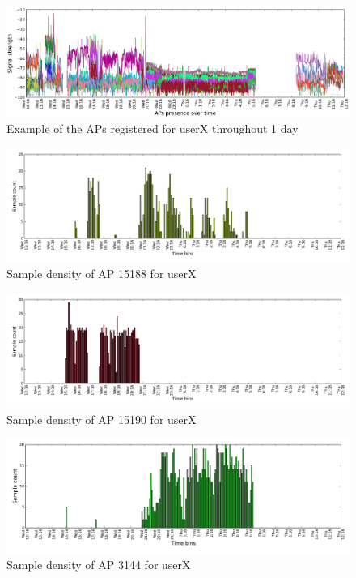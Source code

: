 \begin{figure}[!h]
\centering
\includegraphics[width =\textwidth]{figures/combinations/user_6_sorted_1days_plot_croped.png}
\caption{Example of the APs registered for userX throughout 1 day}
\label{rssi_6_2nd_day_A}
\end{figure}

\begin{figure}[!h]
\centering
\includegraphics[width =\textwidth]{figures/combinations/ap_15188_histo.png}
\caption{Sample density of AP 15188 for userX}
\label{samples_6_2nd_day_1_A}
\end{figure}

\begin{figure}[!h]
\centering
\includegraphics[width =\textwidth]{figures/combinations/ap_15190_histo.png}
\caption{Sample density of AP 15190 for userX}
\label{samples_6_2nd_day_2_A}
\end{figure}

\begin{figure}[!h]
\centering
\includegraphics[width =\textwidth]{figures/combinations/ap_3144_histo.png}
\caption{Sample density of AP 3144 for userX}
\label{samples_6_2nd_day_3_A}
\end{figure}

